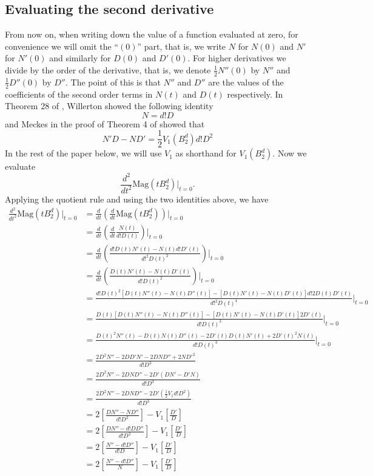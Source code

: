 \documentclass[11pt]{article}
\theoremstyle{mythm}
\begin{document}
\subsection{Evaluating the second derivative}

From now on, when writing down the value of a function evaluated at zero, for convenience we will omit the ``$(0)$'' part, that is, we write $N$ for $N(0)$ and $N'$ for $N'(0)$ and similarly for $D(0)$ and $D'(0)$. For higher derivatives we divide by the order of the derivative, that is, we denote $\frac{1}{2}N''(0)$ by $N''$ and $\frac{1}{2}D''(0)$ by $D''$. The point of this is that $N''$ and $D''$ are the values of the coefficients of the second order terms in $N(t)$ and $D(t)$ respectively. In Theorem 28 of \cite{willerton_magnitude_2017}, Willerton showed the following identity
\begin{equation*}
N = d!D
\end{equation*}
and Meckes in the proof of Theorem 4 of \cite{meckes_magnitude_2019} showed that
\begin{equation*}
N'D - ND' = \frac{1}{2}V_1\left(B_2^d\right)d!D^2
\end{equation*}
In the rest of the paper below, we will use $V_1$ as shorthand for $V_1\left(B_2^d\right)$.
Now we evaluate
\begin{equation*}
\frac{d^2}{dt^2}\text{Mag}(tB_2^d)\big\vert_{t=0}.
\end{equation*}
Applying the quotient rule and using the two identities above, we have
\begin{align*}
\frac{d^2}{dt^2}\text{Mag}(tB_2^d)\big\vert_{t=0} &= \frac{d}{dt}\left(\frac{d}{dt}\text{Mag}(tB_2^d)\right)\big\vert_{t=0} \\
&= \frac{d}{dt}\left(\frac{d}{dt}\frac{N(t)}{d!D(t)}\right)\big\vert_{t=0} \\
&= \frac{d}{dt}\left(\frac{d!D(t)N'(t)-N(t)d!D'(t)}{d!^2D(t)^2}\right)\big\vert_{t=0} \\
&= \frac{d}{dt}\left(\frac{D(t)N'(t)-N(t)D'(t)}{d!D(t)^2}\right)\big\vert_{t=0} \\
&= \frac{d!D(t)^2[D(t)N''(t)-N(t)D''(t)]-[D(t)N'(t)-N(t)D'(t)]d!2D(t)D'(t)}{d!^2D(t)^4}\big\vert_{t=0} \\
&= \frac{D(t)[D(t)N''(t)-N(t)D''(t)]-[D(t)N'(t)-N(t)D'(t)]2D'(t)}{d!D(t)^3}\big\vert_{t=0} \\
&= \frac{D(t)^2N''(t)-D(t)N(t)D''(t)-2D'(t)D(t)N'(t)+2D'(t)^2N(t)}{d!D(t)^3}\big\vert_{t=0} \\
&= \frac{2D^2N''-2DD'N'-2DND''+2ND'^2}{d!D^3} \\
&= \frac{2D^2N''-2DND''-2D'(DN'-D'N)}{d!D^3} \\
&= \frac{2D^2N''-2DND''-2D'(\frac{1}{2}V_1d!D^2)}{d!D^3} \\
&= 2\left[\frac{DN''-ND''}{d!D^2}\right]-V_1\left[\frac{D'}{D}\right] \\
&= 2\left[\frac{DN''-d!DD''}{d!D^2}\right] - V_1\left[\frac{D'}{D}\right] \\
&= 2\left[\frac{N''-d!D''}{d!D}\right] - V_1\left[\frac{D'}{D}\right] \\
&= 2\left[\frac{N''-d!D''}{N}\right] - V_1\left[\frac{D'}{D}\right]
\end{align*}
\end{document}
